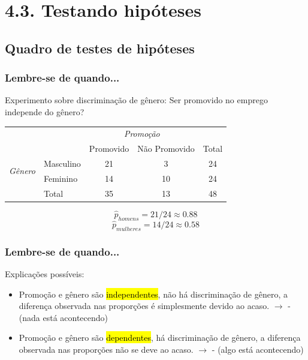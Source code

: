 
\section{4.3. Testando hipóteses}


\subsection{Quadro de testes de hipóteses}


\begin{frame}
\frametitle{Lembre-se de quando...}
\justifying
Experimento sobre discriminação de gênero:
Ser promovido no emprego independe do gênero?

{\small
\begin{tabular}{ll  cc c} 
  		&				& \multicolumn{2}{c}{\textit{Promoção}} \\
\cline{3-4}
							&			& Promovido	& Não Promovido	& Total	\\
\cline{2-5}
\multirow{2}{*}{\textit{Gênero	}}	&Masculino 		& 21	 	& 3		& 24 	\\
							&Feminino		& 14	 	& 10 	 	& 24 \\
\cline{2-5}
							&Total		& 35		& 13		& 48 \\
\end{tabular}
}

\pause
\justifying
\[ \hat{p}_{homens} = 21 / 24 \approx 0.88 \]
\justifying
\[ \hat{p}_{mulheres} = 14 / 24 \approx 0.58 \]

\pause
\end{frame}

\begin{frame}
\frametitle{Lembre-se de quando...}
Explicações possíveis:
\begin{itemize}
\justifying
\item Promoção e gênero são \hl{independentes}, não há discriminação de gênero, a diferença observada nas proporções é simplesmente devido ao acaso. $\rightarrow$  - {\small (nada está acontecendo)}
\justifying
\item Promoção e gênero são \hl{dependentes}, há discriminação de gênero, a diferença observada nas proporções não se deve ao acaso. $\rightarrow$  - {\small (algo está acontecendo)}

\end{itemize}

\end{frame}

